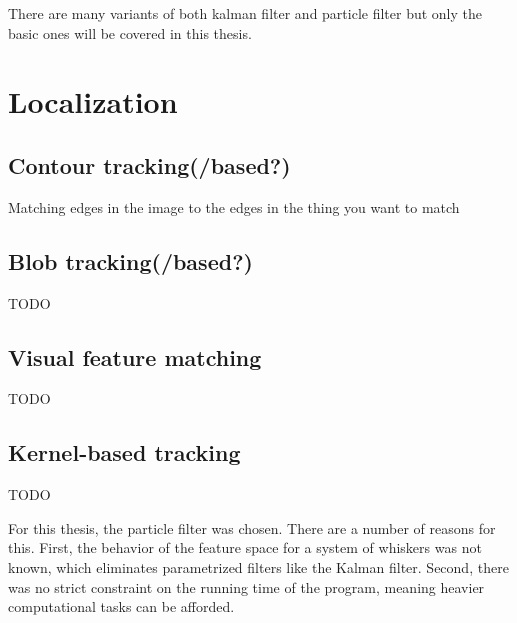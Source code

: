 There are many variants of both kalman filter and particle filter but only the basic ones will be covered in this thesis.

\section{Localization}
\subsection*{Contour tracking(/based?)}
Matching edges in the image to the edges in the thing you want to match

\subsection*{Blob tracking(/based?)}
TODO
\subsection*{Visual feature matching}
TODO
\subsection*{Kernel-based tracking}
TODO


For this thesis, the particle filter was chosen. There are a number of reasons for this. First, the behavior of the feature space for a system of whiskers was not known, which eliminates parametrized filters like the Kalman filter. Second, there was no strict constraint on the running time of the program, meaning heavier computational tasks can be afforded.

